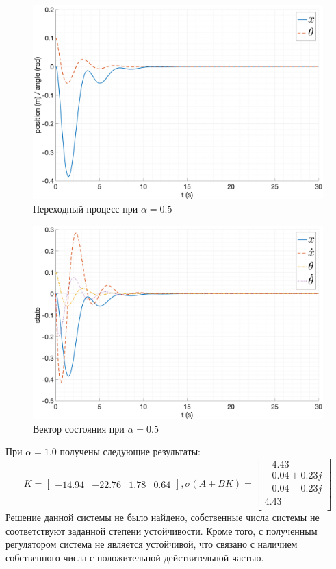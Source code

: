 \begin{figure}[ht!]
    \centering
    \includegraphics[width=\textwidth]{media/plots/nonmodal_controlers_min/out_5.png}
    \caption{Переходный процесс при $\alpha = 0.5$}
    \label{fig:nonmodal_control_alpha_2_2}
\end{figure} 
\begin{figure}[ht!]
    \centering
    \includegraphics[width=\textwidth]{media/plots/nonmodal_controlers_min/state_5.png}
    \caption{Вектор состояния при $\alpha = 0.5$}
    \label{fig:nonmodal_control_alpha_2_2_state}
\end{figure}

\FloatBarrier
При $\alpha = 1.0$ получены следующие результаты: 
\begin{equation}
    K = \begin{bmatrix} -14.94  & -22.76  & 1.78  & 0.64  \end{bmatrix}, \sigma(A + BK) = \begin{bmatrix} -4.43 \\ -0.04 + 0.23j \\ -0.04 - 0.23j \\ 4.43 \\ \end{bmatrix}
\end{equation}
Решение данной системы не было найдено, собственные числа системы не соответствуют заданной степени устойчивости.
Кроме того, с полученным регулятором система не является устойчивой, что связано с наличием 
собственного числа с положительной действительной частью.

